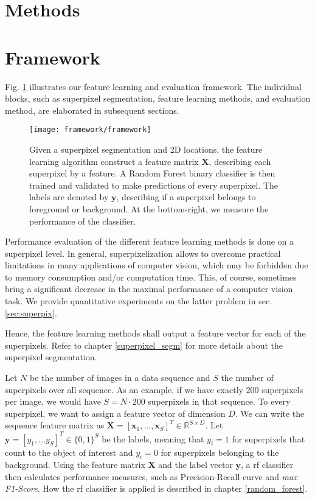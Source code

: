 \section{Methods}
\label{sec:feat_method}

\section{Framework} \label{framework}
Fig. \ref{fig:Framework} illustrates our feature learning and evaluation framework. The individual blocks, such as superpixel segmentation, feature learning methods, and evaluation method, are elaborated in subsequent sections.

\begin{figure}[!htpb]
  \centering
  \texttt{[image: framework/framework]}
  \caption[Framework description]{Given a superpixel segmentation and 2D locations, the feature learning algorithm construct a feature matrix $\boldsymbol{X}$, describing each superpixel by a feature. A Random Forest binary classifier is then trained and validated to make predictions of every superpixel. The labels are denoted by $\boldsymbol{y}$, describing if a superpixel belongs to foreground or background. At the bottom-right, we measure the performance of the classifier.}
  \label{fig:Framework}
\end{figure}

Performance evaluation of the different feature learning methods is done on a superpixel level.
In general, superpixelization allows to overcome practical limitations in many applications of computer vision, which may be forbidden due to memory consumption and/or computation time.
This, of course, sometimes bring a significant decrease in the maximal performance of a computer vision task.
We provide quantitative experiments on the latter problem in sec. \ref{sec:superpix}.

Hence, the feature learning methods shall output a feature vector for each of the superpixels. Refer to chapter \ref{superpixel_segm} for more details about the superpixel segmentation.

Let $N$ be the number of images in a data sequence and $S$ the number of superpixels over all sequence. As an example, if we have exactly $200$ superpixels per image, we would have $S=N \cdot 200$ superpixels in that sequence. To every superpixel, we want to assign a feature vector of dimension $D$. We can write the sequence feature matrix as $\boldsymbol{X} = [\boldsymbol{x}_1,...,\boldsymbol{x}_S]^T \in \mathbb{R}^{S \times D}$. Let $\boldsymbol{y} = [y_1,...y_S]^T \in \{0,1\}^S$ be the labels, meaning that $y_i=1$ for superpixels that count to the object of interest and $y_i=0$ for superpixels belonging to the background. Using the feature matrix $\boldsymbol{X}$ and the label vector $\boldsymbol{y}$, a \gls{rf} classifier then calculates performance measures, such as Precision-Recall curve and \textit{max F1-Score}. How the \gls{rf} classifier is applied is described in chapter \ref{random_forest}.

